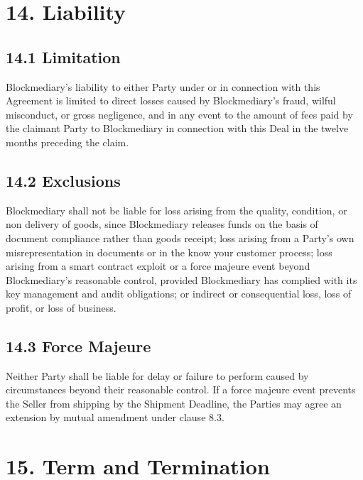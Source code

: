 \documentclass[12pt, a4paper]{article}
\begin{document}
\section*{14. Liability}

\subsection*{14.1 Limitation}

Blockmediary's liability to either Party under or in connection with this Agreement is
limited to direct losses caused by Blockmediary's fraud, wilful misconduct, or gross
negligence, and in any event to the amount of fees paid by the claimant Party to
Blockmediary in connection with this Deal in the twelve months preceding the claim.

\subsection*{14.2 Exclusions}

Blockmediary shall not be liable for loss arising from the quality, condition, or non
delivery of goods, since Blockmediary releases funds on the basis of document compliance
rather than goods receipt; loss arising from a Party's own misrepresentation in documents
or in the know your customer process; loss arising from a smart contract exploit or a
force majeure event beyond Blockmediary's reasonable control, provided Blockmediary has
complied with its key management and audit obligations; or indirect or consequential loss,
loss of profit, or loss of business.

\subsection*{14.3 Force Majeure}

Neither Party shall be liable for delay or failure to perform caused by circumstances
beyond their reasonable control. If a force majeure event prevents the Seller from
shipping by the Shipment Deadline, the Parties may agree an extension by mutual amendment
under clause 8.3.

\section*{15. Term and Termination}
\end{document}

